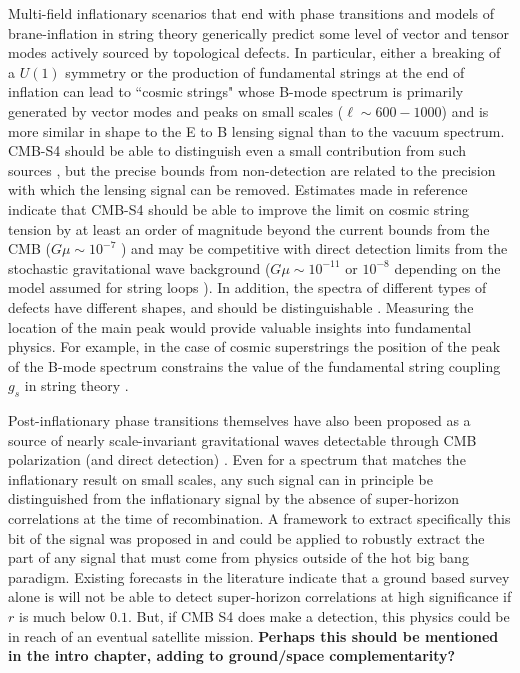 Multi-field inflationary scenarios that end with phase transitions \cite{Hindmarsh:1994re,Vilenkin:1981iu,Kofman:1995fi,Tkachev:1998dc,Jeannerot:1995yn,Jeannerot:2003qv,Rocher:2004my} and models of brane-inflation in string theory \cite{Sarangi:2002yt,Jones:2003da,Copeland:2003bj} generically predict some level of vector and tensor modes actively sourced by topological defects. In particular, either a breaking of a $U(1)$ symmetry or the production of fundamental strings at the end of inflation can lead to ``cosmic strings" whose B-mode spectrum is primarily generated by vector modes and peaks on small scales ($\ell\sim 600 - 1000$) and is more similar in shape to the E to B lensing signal than to the vacuum spectrum. CMB-S4 should be able to distinguish even a small contribution from such sources \cite{Urrestilla:2008jv}, but the precise bounds from non-detection are related to the precision with which the lensing signal can be removed. Estimates made in reference \cite{Seljak:2006hi,Avgoustidis:2011ax} indicate that CMB-S4 should be able to improve the limit on cosmic string tension by at least an order of magnitude beyond the current bounds from the CMB ($G\mu\sim10^{-7}$ \cite{Ade:2015ava,Ade:2013xla}) and may be competitive with direct detection limits from the stochastic gravitational wave background ($G\mu\sim10^{-11}$ or $10^{-8}$ depending on the model assumed for string loops \cite{Arzoumanian:2015liz}). In addition, the spectra of different types of defects have different shapes, and should be distinguishable \cite{Urrestilla:2007sf,Avgoustidis:2011ax}. Measuring the location of the main peak would provide valuable insights into fundamental physics. For example, in the case of cosmic superstrings the position of the peak of the B-mode spectrum constrains the value of the fundamental string coupling $g_s$ in string theory \cite{Avgoustidis:2011ax}. 



Post-inflationary phase transitions themselves have also been proposed as a source of nearly scale-invariant gravitational waves detectable through CMB polarization (and direct detection) \cite{Krauss:1991qu,JonesSmith:2007ne}. Even for a spectrum that matches the inflationary result on small scales, any such signal can in principle be distinguished from the inflationary signal by the absence of super-horizon correlations at the time of recombination. A framework to extract specifically this bit of the signal was proposed in \cite{Baumann:2009mq} and could be applied to robustly extract the part of any signal that must come from physics outside of the hot big bang paradigm. Existing forecasts in the literature \cite{Lee:2014cya} indicate that a ground based survey alone is will not be able to detect super-horizon correlations at high significance if $r$ is much below $0.1$. But, if CMB S4 does make a detection, this physics could be in reach of an eventual satellite mission. {\bf Perhaps this should be mentioned in the intro chapter, adding to ground/space complementarity?}


